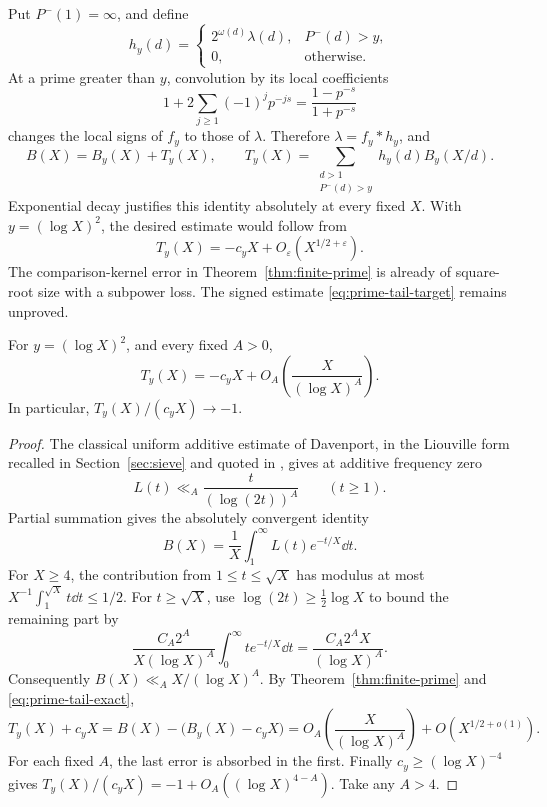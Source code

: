 Put \(P^-(1)=\infty\), and define
\[
 h_y(d)=
 \begin{cases}
   2^{\omega(d)}\lambda(d),&P^-(d)>y,\\
   0,&\text{otherwise}.
 \end{cases}
\]
At a prime greater than \(y\), convolution by its local coefficients
\[
 1+2\sum_{j\ge1}(-1)^jp^{-js}
       =\frac{1-p^{-s}}{1+p^{-s}}
\]
changes the local signs of \(f_y\) to those of \(\lambda\).
Therefore \(\lambda=f_y*h_y\), and
\begin{equation}\label{eq:prime-tail-exact}
 B(X)=B_y(X)+T_y(X),\qquad
 T_y(X)=\sum_{\substack{d>1\\P^-(d)>y}}
                h_y(d)B_y(X/d).
\end{equation}
Exponential decay justifies this identity absolutely at every
fixed \(X\). With \(y=(\log X)^2\), the desired estimate would follow
from
\begin{equation}\label{eq:prime-tail-target}
 T_y(X)=-c_yX+O_\varepsilon(X^{1/2+\varepsilon}).
\end{equation}
The comparison-kernel error in Theorem~\ref{thm:finite-prime}
is already of square-root size with a subpower loss.
The signed estimate \eqref{eq:prime-tail-target} remains unproved.

\begin{proposition}
\label{prop:prime-tail-logarithmic}
For \(y=(\log X)^2\), and every fixed \(A>0\),
\[
 T_y(X)=-c_yX+O_A\!\left(\frac{X}{(\log X)^A}\right).
\]
In particular, \(T_y(X)/(c_yX)\to-1\).
\end{proposition}
\begin{proof}
The classical uniform additive estimate of Davenport, in the
Liouville form recalled in Section~\ref{sec:sieve} and quoted in
\cite{mrt}, gives at additive frequency zero
\[
 L(t)\ll_A \frac{t}{(\log(2t))^A}
 \qquad(t\ge1).
\]
Partial summation gives the absolutely convergent identity
\[
 B(X)=\frac1X\int_1^\infty L(t)e^{-t/X}\dd t.
\]
For \(X\ge4\), the contribution from \(1\le t\le\sqrt X\)
has modulus at most \(X^{-1}\int_1^{\sqrt X}t\dd t\le1/2\).
For \(t\ge\sqrt X\), use
\(\log(2t)\ge\tfrac12\log X\) to bound the remaining part by
\[
 \frac{C_A2^A}{X(\log X)^A}
     \int_0^\infty te^{-t/X}\dd t
 =\frac{C_A2^AX}{(\log X)^A}.
\]
Consequently \(B(X)\ll_A X/(\log X)^A\).
By Theorem~\ref{thm:finite-prime} and
\eqref{eq:prime-tail-exact},
\[
 T_y(X)+c_yX
   =B(X)-\bigl(B_y(X)-c_yX\bigr)
   =O_A\!\left(\frac{X}{(\log X)^A}\right)
        +O(X^{1/2+o(1)}).
\]
For each fixed \(A\), the last error is absorbed in the first.
Finally \(c_y\ge(\log X)^{-4}\) gives
\(T_y(X)/(c_yX)=-1+O_A((\log X)^{4-A})\).
Take any \(A>4\).
\end{proof}

